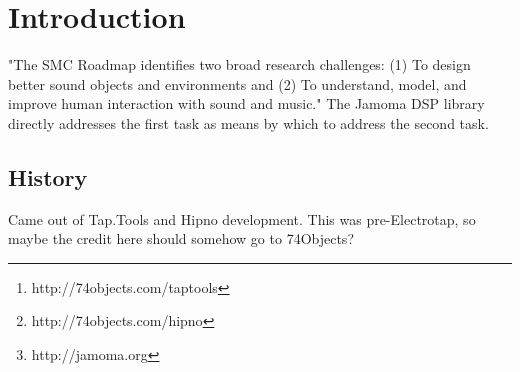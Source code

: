 \documentclass[twoside,10pt]{article}
\affiliation{}{}
\title{\papertitle}
\begin{document}
    
\maketitle


\begin{abstract}

This paper presents an object-oriented, reflective, light-weight application programming interface for C++, with an emphasis on real-time signal processing. It makes use of polymorphic typing, dynamic binding, and introspection to create a cross-platform environment pulling ideas from languages such as Smalltalk and Objective-C while remaining within the bounds of the portable and cross-platform C++ context.  The Jamoma Foundation and DSP Library provide a flexible framework and runtime environment, as well as an expanding collection of unit generators for synthesis, processing, and analysis.  This library has been used in both open source and commercial software projects over the past seven years including Electrotap's Tap.Tools\footnote{http://74objects.com/taptools}, Cycling '74's Hipno\footnote{http://74objects.com/hipno}, and the Jamoma Modular Framework\footnote{http://jamoma.org}.

\end{abstract}



\section{Introduction} %
\label{sec:introduction}

"The SMC Roadmap identifies two broad research challenges: (1) To design better sound objects and environments and (2) To understand, model, and improve human interaction with sound and music." \cite{serra:2007}  The Jamoma DSP library directly addresses the first task as means by which to address the second task.

\subsection{History}

Came out of Tap.Tools and Hipno development.  This was pre-Electrotap, so maybe the credit here should somehow go to 74Objects?
\end{document}
